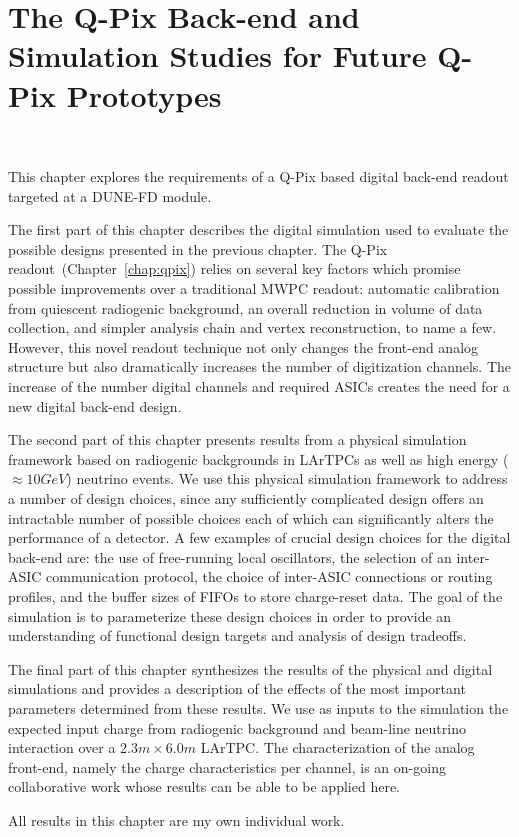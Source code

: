 \chapter{The Q-Pix Back-end and Simulation Studies for Future Q-Pix Prototypes}~\label{chap:sim}

This chapter explores the requirements of a Q-Pix based digital back-end readout targeted at a DUNE-FD module.

The first part of this chapter describes the digital simulation used to evaluate the possible designs presented in the previous chapter.
The Q-Pix readout~(Chapter~\ref{chap:qpix}) relies on several key factors which promise possible improvements over a traditional MWPC readout: automatic calibration from quiescent radiogenic background, an overall reduction in volume of data collection, and simpler analysis chain and vertex reconstruction, to name a few.
However, this novel readout technique not only changes the front-end analog structure but also dramatically increases the number of digitization channels.
The increase of the number digital channels and required ASICs creates the need for a new digital back-end design.

The second part of this chapter presents results from a physical simulation framework based on radiogenic backgrounds in LArTPCs as well as high energy ($\approx 10\unit{GeV}$) neutrino events.
We use this physical simulation framework to address a number of design choices, since any sufficiently complicated design offers an intractable number of possible choices each of which can significantly alters the performance of a detector.
A few examples of crucial design choices for the digital back-end are: the use of free-running local oscillators, the selection of an inter-ASIC communication protocol, the choice of inter-ASIC connections or routing profiles, and the buffer sizes of FIFOs to store charge-reset data.
The goal of the simulation is to parameterize these design choices in order to provide an understanding of functional design targets and analysis of design tradeoffs.

The final part of this chapter synthesizes the results of the physical and digital simulations and provides a description of the effects of the most important parameters determined from these results.
We use as inputs to the simulation the expected input charge from radiogenic background and beam-line neutrino interaction over a $2.3 \unit{m} \times 6.0 \unit{m}$ LArTPC.
The characterization of the analog front-end, namely the charge characteristics per channel, is an on-going collaborative work whose results can be able to be applied here.

All results in this chapter are my own individual work.





